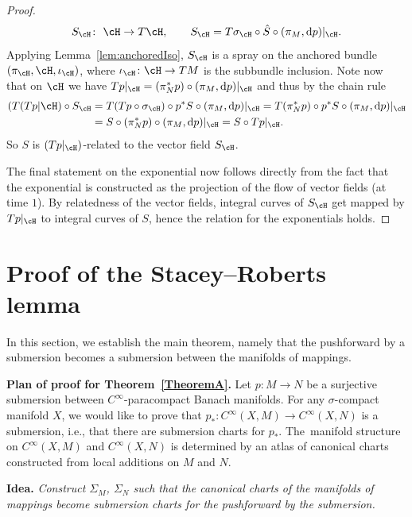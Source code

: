 \begin{proof}
\begin{displaymath}
 S_\cH \colon \ \cH \rightarrow T\cH,\qquad S_\cH = T\sigma_\cH \circ \hat{S} \circ (\pi_M, {\rm d}p)|_{\cH}.\end{displaymath}
Applying Lemma~\ref{lem:anchoredIso}, $S_{\cH}$ is a spray on the anchored bundle $(\pi_{\cH}, \cH, \iota_\cH)$, where $\iota_\cH \colon \cH \rightarrow TM$ is the subbundle inclusion.
Note now that on $\cH$ we have $Tp|_\cH = (\pi_N^\ast p) \circ (\pi_M,{\rm d}p)|_\cH$ and thus by the chain rule
\begin{align*}
(T(Tp|\cH) \circ S_\cH &= T(Tp \circ \sigma_\cH) \circ p^\ast S\circ (\pi_M, {\rm d}p)|_{\cH} = T(\pi_N^\ast p) \circ p^\ast S \circ (\pi_M, {\rm d}p)|_{\cH} \\
&= S \circ (\pi_N^\ast p) \circ (\pi_M, {\rm d}p)|_{\cH} = S \circ Tp|_{\cH}.
\end{align*}
So $S$ is $(Tp|_{\cH})$-related to the vector field $S_\cH$.

The final statement on the exponential now follows directly from the fact that the exponential is constructed as the projection of the flow of vector fields (at time $1$). By relatedness of the vector fields, integral curves of $S_\cH$ get mapped by $Tp|_{\cH}$ to integral curves of $S$, hence the relation for the exponentials holds.
\end{proof}

\section{Proof of the Stacey--Roberts lemma}

In this section, we establish the main theorem, namely that the pushforward by a submersion becomes a submersion between the manifolds of mappings.

{\bf Plan of proof for Theorem~\ref{TheoremA}.}\label{plan_of_attack}
Let $p \colon M \rightarrow N$ be a surjective submersion between $C^\infty$-paracompact Banach manifolds. For any $\sigma$-compact manifold $X$, we would like to prove that $p_\ast \colon C^\infty (X,M) \rightarrow C^\infty (X,N)$ is a submersion, i.e., that there are submersion charts for $p_\ast$.
The~manifold structure on $C^\infty (X,M)$ and $C^\infty (X,N)$ is determined by an atlas of canonical charts constructed from local additions on $M$ and $N$.

{\bf Idea.} \emph{Construct $\Sigma_M$, $\Sigma_N$ such that the canonical charts of the manifolds of mappings become submersion charts for the pushforward by the submersion.}

